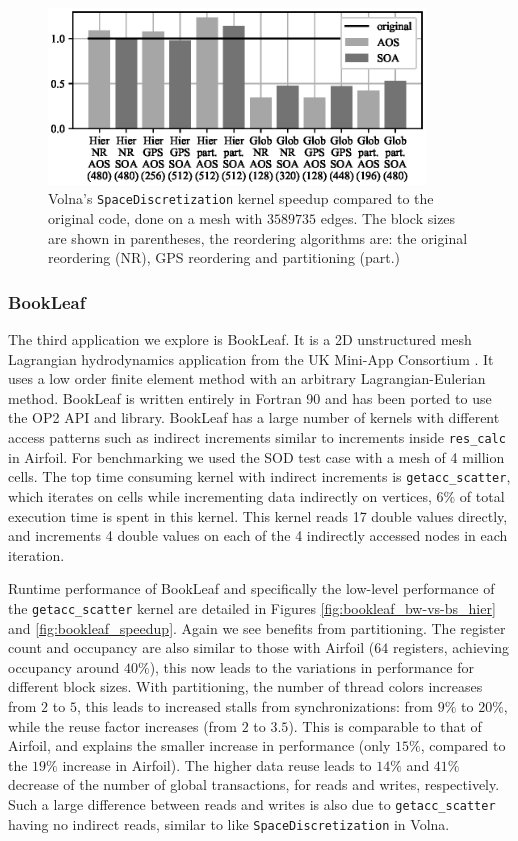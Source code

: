 \begin{figure}[Htbp]
\centering
\includegraphics[width=10cm]{fig/volna_speedup.eps}
\caption{Volna's \texttt{SpaceDiscretization} kernel speedup compared to the 
original code, done on a mesh with $3589735$ edges. The block sizes are shown 
in parentheses, the reordering algorithms are: the original reordering (NR), 
GPS reordering and partitioning (part.)}
\label{fig:volna_speedup}
\end{figure}



\subsubsection{BookLeaf}
\noindent The third application we explore is BookLeaf. It is a 2D unstructured
mesh Lagrangian hydrodynamics application from the UK Mini-App Consortium
\cite{uk-mac}. It uses a low order finite element method with an arbitrary
Lagrangian-Eulerian method.  BookLeaf is written entirely in Fortran 90 and has
been ported to use the OP2 API and library. BookLeaf has a large number of
kernels with different access patterns such as indirect increments similar to
increments inside \texttt{res\_calc} in Airfoil. For benchmarking we used the
SOD test case with a mesh of 4 million cells. The top time consuming kernel with
indirect increments is \texttt{getacc\_scatter}, which iterates on cells while
incrementing data indirectly on vertices, $6\%$ of total execution time is spent
in this kernel. This kernel reads 17 double values directly, and increments 4
double values on each of the 4 indirectly accessed nodes in each iteration.

Runtime performance of BookLeaf and specifically the low-level performance of 
the \texttt{getacc\_scatter} kernel are detailed in Figures
\ref{fig:bookleaf_bw-vs-bs_hier} and \ref{fig:bookleaf_speedup}. Again we see  
benefits from partitioning. The register count and occupancy are also similar to 
those with Airfoil ($64$ registers, achieving occupancy around $40\%$), this 
now leads to the variations in performance for different block sizes. With 
partitioning, the number of thread colors increases from $2$ to $5$, this
leads to increased stalls from synchronizations: from $9\%$ to $20\%$, while
the reuse factor increases (from $2$ to $3.5$). This is comparable to 
that of Airfoil, and explains the smaller increase in performance (only $15\%$, 
compared to the $19\%$ increase in Airfoil). The higher data reuse leads to 
$14\%$ and $41\%$ decrease of the number of global transactions, for reads and 
writes, respectively. Such a large difference between reads and writes is also 
due to \texttt{getacc\_scatter} having no indirect reads, similar to 
like \texttt{SpaceDiscretization} in Volna. 

